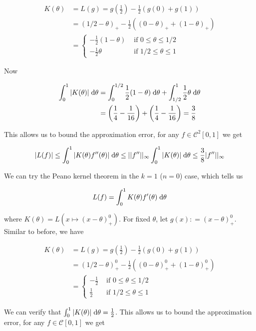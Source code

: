 \documentclass[a4paper]{article}
\begin{document}
\begin{align*}
K(\theta) & = L(g) = g(\frac{1}{2}) - \frac{1}{2}(g(0) + g(1) )\\
& = (1/2-\theta)_{+} - \frac{1}{2} \left(  (0-\theta)_{+} + (1-\theta)_{+} \right) \\
& = \begin{cases} -\frac{1}{2} (1-\theta) & \text{ if }  0 \leq \theta \leq 1/2 \\ - \frac{1}{2} \theta  & \text{ if } 1/2 \leq \theta \leq 1\end{cases}
\end{align*}

Now

\begin{align*}
\int_{0}^{1} | K(\theta) | \; \mathrm{d} \theta & = \int_{0}^{1/2} \frac{1}{2} (1 - \theta) \; \mathrm{d} \theta  + \int_{1/2}^{1} \frac{1}{2} \theta\; \mathrm{d} \theta \\
& = \left(  \frac{1}{4} - \frac{1}{16} \right) + \left(  \frac{1}{4} - \frac{1}{16} \right) = \frac{3}{8}
\end{align*}


This allows us to bound the approximation error, for any $ f \in \mathcal{C}^{2}[0,1] $ we get

\[ | L(f) | \leq \int_{0}^{1} |  K(\theta) f''(\theta) | \; \mathrm{d} \theta \leq | | f''| |_{\infty} \int_{0}^{1} | K(\theta) | \; \mathrm{d} \theta \leq \frac{3}{8 } | f''| |_{\infty} \]

We can try the Peano kernel theorem in the $ k=1 $ ($ n = 0 $) case, which tells us 

\[ L(f) = \int_{0}^{1} K(\theta) f'(\theta) \; \mathrm{d} \theta   \]


where $ K(\theta) = L(   x \mapsto (x-\theta)_{+}^{0} ) $. For fixed $ \theta $,  let $ g(x) : = (x-\theta)_{+}^{0} $. Similar to before, we have

\begin{align*}
K(\theta) & = L(g) = g(\frac{1}{2}) - \frac{1}{2}(g(0) + g(1) )\\
& = (1/2-\theta)_{+}^{0} - \frac{1}{2} \left(  (0-\theta)_{+}^{0} + (1-\theta)_{+}^{0} \right) \\
& = \begin{cases} -\frac{1}{2} & \text{ if }  0 \leq \theta \leq 1/2 \\ \frac{1}{2}  & \text{ if } 1/2 \leq \theta \leq 1\end{cases}
\end{align*}

We can verify that $ \int_{0}^{1} |  K(\theta) | \; \mathrm{d} \theta = \frac{1}{2} $. This allows us to bound the approximation error, for any $ f \in \mathcal{C}[0,1] $ we get
\end{document}

